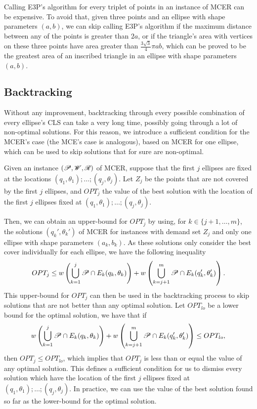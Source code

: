 Calling E3P's algorithm for every triplet of points in an instance of MCER can be expensive. To avoid that, given three points and an ellipse with shape parameters $(a, b)$, we can skip calling E3P's algorithm if the maximum distance between any of the points is greater than $2a$, or if the triangle's area with vertices on these three points have area greater than $\frac{3\sqrt{3}}{4}\pi ab$, which can be proved to be the greatest area of an inscribed triangle in an ellipse with shape parameters $(a, b)$.

\subsection{Backtracking}

Without any improvement, backtracking through every possible combination of every ellipse's CLS can take a very long time, possibly going through a lot of non-optimal solutions. 
For this reason, we introduce a sufficient condition for the MCER's case (the MCE's case is analogous), based on MCER for one ellipse, which can be used to skip solutions that for sure are non-optimal.

Given an instance $(\mathscr{P}, \mathscr{W}, \mathscr{R})$ of MCER, suppose that the first $j$ ellipses are fixed at the locations $(q_1, \theta_1); \dots; (q_j, \theta_j)$.
Let $Z_j$ be the points that are not covered by the first $j$ ellipses, and $OPT_j$ the value of the best solution with the location of the first $j$ ellipses fixed at $(q_1, \theta_1); \dots; (q_j, \theta_j)$.

Then, we can obtain an upper-bound for $OPT_j$ by using, for $k\in\{j+1, \dots, m\}$, the solutions $(q_k', \theta_k')$ of MCER for instances with demand set $Z_j$ and only one ellipse with shape parameters $(a_k, b_k)$. As these solutions only consider the best cover individually for each ellipse, we have the following inequality
\begin{equation}
OPT_j \le w\left(\bigcup_{k=1}^{j} \mathscr{P} \cap E_k(q_k, \theta_k)\right) + w\left(\bigcup_{k=j+1}^{m} \mathscr{P} \cap E_k(q_k', \theta_k')\right).
\end{equation}
This upper-bound for $OPT_j$ can then be used in the backtracking process to skip solutions that are not better than any optimal solution. Let $OPT_{lo}$ be a lower bound for the optimal solution, we have that if
\begin{equation}
\label{eq:upper-bound}
w\left(\bigcup_{k=1}^{j} \mathscr{P} \cap E_k(q_k, \theta_k)\right) +w\left(\bigcup_{k=j+1}^{m} \mathscr{P} \cap E_k(q_k', \theta_k')\right) \le OPT_{lo},
\end{equation}
then $OPT_j \le OPT_{lo}$, which implies that $OPT_j$ is less than or equal the value of any optimal solution. This defines a sufficient condition for us to dismiss every solution which have the location of the first $j$ ellipses fixed at $(q_1, \theta_1); \dots; (q_j, \theta_j)$. In practice, we can use the value of the best solution found so far as the lower-bound for the optimal solution.

